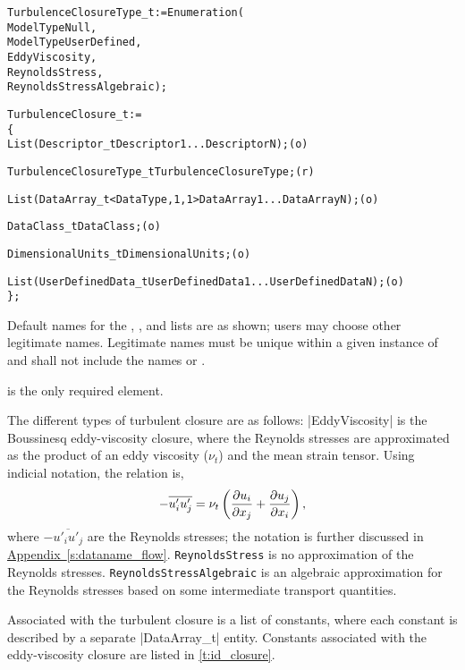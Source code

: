 \begin{alltt}
  TurbulenceClosureType\_t := Enumeration(
    ModelTypeNull,
    ModelTypeUserDefined,
    EddyViscosity,
    ReynoldsStress,
    ReynoldsStressAlgebraic ) ;

  TurbulenceClosure\_t :=
    \{
    List( Descriptor\_t Descriptor1 ... DescriptorN ) ;                      (o)

    TurbulenceClosureType\_t TurbulenceClosureType ;                         (r)
    
    List( DataArray\_t<DataType, 1, 1> DataArray1 ... DataArrayN ) ;         (o)

    DataClass\_t DataClass ;                                                 (o)
                
    DimensionalUnits\_t DimensionalUnits ;                                   (o)

    List( UserDefinedData\_t UserDefinedData1 ... UserDefinedDataN ) ;       (o)
    \} ;
\end{alltt}

\begin{notes}
\item
 Default names for the , , and
 lists are as shown; users may choose other legitimate names.
 Legitimate names must be unique within a given instance of
  and shall not include the names
  or .
\item
  is the only required element.
\end{notes}

The different types of turbulent closure are as follows: |EddyViscosity| is
the Boussinesq eddy-viscosity closure, where the Reynolds stresses are
approximated as the product of an eddy viscosity ($\nu_t$) and the mean
strain tensor.
Using indicial notation, the relation is,
$$
  - \overline{u'_i u'_j} = \nu_t \left( {\partial u_i \over \partial x_j} + {\partial u_j \over \partial x_i} \right),
$$
where $- \overline{u'_i u'_j}$ are the Reynolds stresses; the notation is
further discussed in
\hyperref[s:dataname_flow]{Appendix~\ref*{s:dataname_flow}}.
\texttt{Rey\-nolds\-Stress} is no approximation of the Reynolds stresses.
\texttt{ReynoldsStressAlgebraic} is an algebraic approximation for the
Reynolds stresses based on some intermediate transport quantities.

Associated with the turbulent closure is a list of constants, where each
constant is described by a separate |DataArray_t| entity.
Constants associated with the eddy-viscosity closure are listed in
\autoref{t:id_closure}.

